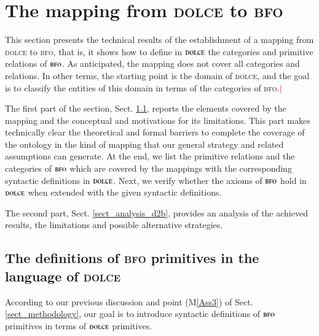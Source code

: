 \documentclass[ao]{iosart2x}
\newcommand{\nb}[1]{\textcolor{red}{$|$}\marginpar{\hspace*{-0cm}\parbox{20mm}{\scriptsize\raggedright\textcolor{red}{#1}}}}
\newcommand{\dolce}{{\textsc{dolce}}}
\newcommand{\bfo}{{\textsc{bfo}}}
\newcommand {\thdolce} {\ensuremath{\mathfrak{D}}}
\begin{document}
\section{The mapping from {\dolce} to {\bfo}}\label{sect_d2b}


This section presents the technical results of the establishment of a mapping from {\dolce} to {\bfo}, that is, it shows how to define in {$\dolce$} the categories and primitive relations of {$\bfo$}. As anticipated, the mapping does not cover all categories and relations. 
In other terms, the starting point is the domain of {\dolce}, and the goal is to classify the entities of this domain in terms of the categories of {\bfo}.\nb{check!!}

The first part of the section, Sect. \ref{sect_mappings_d2b}, reports the elements covered by the mapping and the conceptual and motivations for its limitations. This part makes technically clear the theoretical and formal barriers to complete the coverage of the ontology in the kind of mapping that our general strategy and related assumptions can generate. 
At the end, we list the primitive relations and the categories of {$\bfo$} which are covered by the mappings with the corresponding syntactic definitions in {$\dolce$}. 
Next, we verify whether the axioms of {$\bfo$} hold in {$\dolce$} when extended with the given syntactic definitions. 

The second part, Sect. \ref{sect_analysis_d2b}, provides an analysis of the achieved results, the limitations and possible alternative strategies.


\subsection{The definitions of {\bfo} primitives in the language of {\dolce}}\label{sect_mappings_d2b}
According to our previous discussion and point (M\ref{Ass3}) of Sect. \ref{sect_methodology}, our goal is to introduce syntactic definitions of {$\bfo$} primitives in terms of {$\dolce$} primitives.
\end{document}
